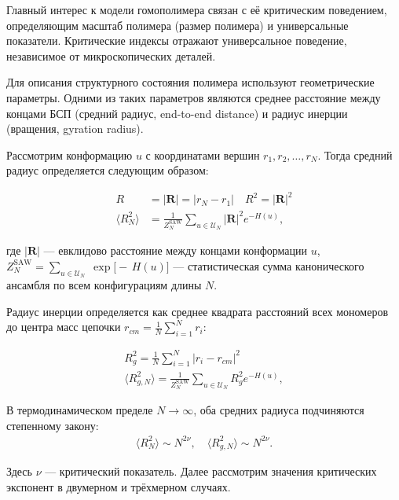Главный интерес к модели гомополимера связан с её критическим поведением, определяющим масштаб полимера (размер полимера) и универсальные показатели.  
Критические индексы отражают универсальное поведение, независимое от микроскопических деталей.   

Для описания  структурного состояния полимера используют геометрические параметры.
Одними из таких параметров являются среднее расстояние между концами БСП (средний радиус, end-to-end distance) и радиус инерции (вращения, gyration radius).

Рассмотрим конформацию $u$ с координатами вершин ${r_1, r_2, \dots, r_N}$. 
Тогда средний радиус определяется следующим образом: 

\begin{align}
	\label{endtoend}
	R &=  |\mathbf R| = | r_N - r_1 |  	\quad  R^2=\lvert \mathbf R\rvert^2     \\
	\langle R_N^2 \rangle  &=  \frac{1}{Z_N^{\text{SAW}}} \sum_{  u \in  \mathcal U_N }  |\mathbf R|^2 e^{-H(u)},
\end{align}

где $|\mathbf R|$ --- евклидово расстояние между концами конформации  $u$,  $Z_N^{\text{SAW}} =  \sum_{u\in \mathcal U_N}  \;\exp\!\big[-\,H(u)\big] $ --- статистическая сумма  канонического ансамбля по всем конфигурациям длины $N$. 

Радиус инерции  определяется как среднее квадрата расстояний всех мономеров до центра масс цепочки $r_{cm}=\frac{1}{N}\sum_{i=1}^N r_i$:

\begin{align}
	\label{gyration}
	R_g ^2 = \frac{1}{N} \sum_{i=1}^N  |r_i - r_{cm}|  ^2     \\
		\langle R_{g, N}^2 \rangle  =  \frac{1}{Z_N^{\text{SAW}}} \sum_{  u \in  \mathcal U_N }  R_g ^2 e^{-H(u)},
\end{align}

В термодинамическом пределе  $N \rightarrow \infty $,  оба средних радиуса подчиняются степенному закону: 
\begin{align}
	\label{r_scale}
	\langle R_N^2 \rangle \sim N^{2 \nu } ,	\quad 
		\langle R_{g, N}^2 \rangle \sim N^{2 \nu }. 
\end{align} 

Здесь ${\nu} $  --- критический показатель. Далее рассмотрим  значения критических  экспонент  в двумерном и трёхмерном случаях.  

 


